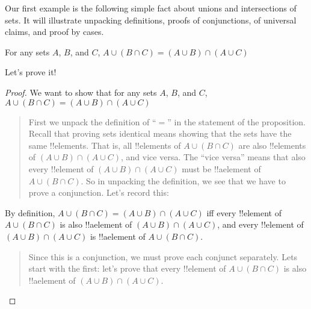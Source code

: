 \documentclass[../../../include/open-logic-section]{subfiles}
\begin{document}

Our first example is the following simple fact about unions and
intersections of sets.  It will illustrate unpacking definitions,
proofs of conjunctions, of universal claims, and proof by cases.

\begin{prop}
For any sets $A$, $B$, and $C$, $A \cup (B \cap C) = (A \cup B)
\cap (A \cup C)$
\end{prop}

Let's prove it!{}

\begin{proof}
We want to show that for any sets $A$, $B$, and $C$, $A \cup (B \cap
C) = (A \cup B) \cap (A \cup C)$
\begin{quote}
First we unpack the definition of ``$=$'' in the statement of the
proposition. Recall that proving sets identical means showing that the
sets have the same !!{element}s. That is, all !!{element}s of $A \cup
(B \cap C)$ are also !!{element}s of $(A \cup B) \cap (A \cup C)$, and
vice versa.  The ``vice versa'' means that also every !!{element} of $(A
\cup B) \cap (A \cup C)$ must be !!a{element} of $A \cup (B \cap
C)$.  So in unpacking the definition, we see that we have to prove a
conjunction.  Let's record this:
\end{quote}
By definition, $A \cup (B \cap C) = (A \cup B) \cap (A \cup C)$ iff
every !!{element} of $A \cup (B \cap C)$ is also !!a{element} of $(A
\cup B) \cap (A \cup C)$, and every !!{element} of $(A \cup B) \cap (A
\cup C)$ is !!a{element} of $A \cup (B \cap C)$.
\begin{quote}
Since this is a conjunction, we must prove each conjunct
separately. Lets start with the first: let's prove that every
!!{element} of $A \cup (B \cap C)$ is also !!a{element} of $(A
\cup B) \cap (A \cup C)$.


\end{quote}
\end{proof}
\end{document}
